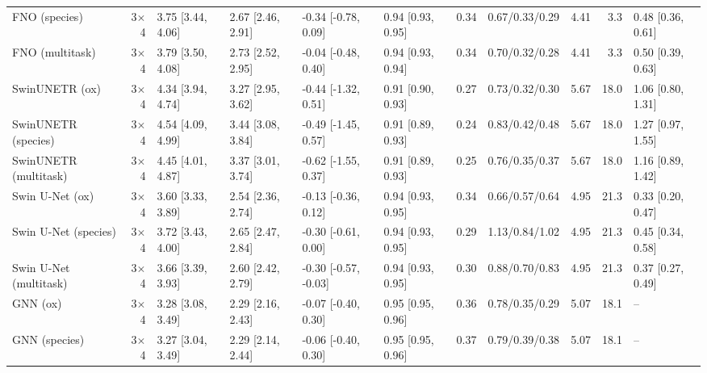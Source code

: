 \begin{table}[t]
\begin{tabular}{lrllllrlrrl}
FNO (species) & 3$\times$4 & 3.75 \scriptsize[3.44, 4.06] & 2.67 \scriptsize[2.46, 2.91] & -0.34 \scriptsize[-0.78, 0.09] & 0.94 \scriptsize[0.93, 0.95] & 0.34 & 0.67/0.33/0.29 & 4.41 & 3.3 & 0.48 \scriptsize[0.36, 0.61] \\
FNO (multitask) & 3$\times$4 & 3.79 \scriptsize[3.50, 4.08] & 2.73 \scriptsize[2.52, 2.95] & -0.04 \scriptsize[-0.48, 0.40] & 0.94 \scriptsize[0.93, 0.94] & 0.34 & 0.70/0.32/0.28 & 4.41 & 3.3 & 0.50 \scriptsize[0.39, 0.63] \\
SwinUNETR (ox) & 3$\times$4 & 4.34 \scriptsize[3.94, 4.74] & 3.27 \scriptsize[2.95, 3.62] & -0.44 \scriptsize[-1.32, 0.51] & 0.91 \scriptsize[0.90, 0.93] & 0.27 & 0.73/0.32/0.30 & 5.67 & 18.0 & 1.06 \scriptsize[0.80, 1.31] \\
SwinUNETR (species) & 3$\times$4 & 4.54 \scriptsize[4.09, 4.99] & 3.44 \scriptsize[3.08, 3.84] & -0.49 \scriptsize[-1.45, 0.57] & 0.91 \scriptsize[0.89, 0.93] & 0.24 & 0.83/0.42/0.48 & 5.67 & 18.0 & 1.27 \scriptsize[0.97, 1.55] \\
SwinUNETR (multitask) & 3$\times$4 & 4.45 \scriptsize[4.01, 4.87] & 3.37 \scriptsize[3.01, 3.74] & -0.62 \scriptsize[-1.55, 0.37] & 0.91 \scriptsize[0.89, 0.93] & 0.25 & 0.76/0.35/0.37 & 5.67 & 18.0 & 1.16 \scriptsize[0.89, 1.42] \\
Swin U-Net (ox) & 3$\times$4 & 3.60 \scriptsize[3.33, 3.89] & 2.54 \scriptsize[2.36, 2.74] & -0.13 \scriptsize[-0.36, 0.12] & 0.94 \scriptsize[0.93, 0.95] & 0.34 & 0.66/0.57/0.64 & 4.95 & 21.3 & 0.33 \scriptsize[0.20, 0.47] \\
Swin U-Net (species) & 3$\times$4 & 3.72 \scriptsize[3.43, 4.00] & 2.65 \scriptsize[2.47, 2.84] & -0.30 \scriptsize[-0.61, 0.00] & 0.94 \scriptsize[0.93, 0.95] & 0.29 & 1.13/0.84/1.02 & 4.95 & 21.3 & 0.45 \scriptsize[0.34, 0.58] \\
Swin U-Net (multitask) & 3$\times$4 & 3.66 \scriptsize[3.39, 3.93] & 2.60 \scriptsize[2.42, 2.79] & -0.30 \scriptsize[-0.57, -0.03] & 0.94 \scriptsize[0.93, 0.95] & 0.30 & 0.88/0.70/0.83 & 4.95 & 21.3 & 0.37 \scriptsize[0.27, 0.49] \\
GNN (ox) & 3$\times$4 & 3.28 \scriptsize[3.08, 3.49] & 2.29 \scriptsize[2.16, 2.43] & -0.07 \scriptsize[-0.40, 0.30] & 0.95 \scriptsize[0.95, 0.96] & 0.36 & 0.78/0.35/0.29 & 5.07 & 18.1 & -- \\
GNN (species) & 3$\times$4 & 3.27 \scriptsize[3.04, 3.49] & 2.29 \scriptsize[2.14, 2.44] & -0.06 \scriptsize[-0.40, 0.30] & 0.95 \scriptsize[0.95, 0.96] & 0.37 & 0.79/0.39/0.38 & 5.07 & 18.1 & -- \\

\end{tabular}
\end{table}
